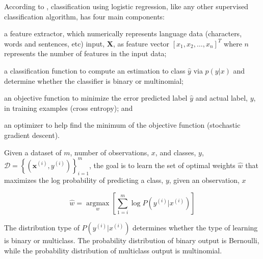  According to \cite{jurafsky2014speech}, classification using logistic regression, like any other supervised classification algorithm, has four main components: 

\begin{list}{•}{}
 \item a feature extractor, which  numerically represents language data (characters, words and sentences, etc) input, $\mathbf{X}$, as feature vector $\left[x_1,x_2,\ldots,x_n \right]^T$ where $n$  represents the number of features in the input data;

\item a classification function to compute an estimation to class $\hat{y}$ via $p(y|x)$ and determine whether the classifier is binary or multinomial; 
 
\item an objective function to minimize the error predicted label $\hat{y}$ and actual label, $y$, in training examples (cross entropy); and

\item an optimizer to help find the minimum of the objective function 
 (stochastic gradient descent).
 \end{list}


Given a dataset of $m$, number of observations, $x$, and classes, $y$, $\mathcal { D } = \left\{ \left( \boldsymbol { x } ^ { ( i ) } , y ^ { ( i ) } \right) \right\} _ { i = 1 } ^ { m }$, the goal is to learn the set of optimal weights $\hat{w}$ that maximizes the log probability of predicting a class, $y$, given an observation, $x$

\begin{equation}
\hat{w}=\underset{w}{\operatorname{argmax}}\left[\sum_{1=i}^{m} \log P\left(y^{(i)} | x^{(i)}\right)\right]
\end{equation}

The distribution type of $P\left(y^{(i)} | x^{(i)}\right)$ determines whether the type of learning is binary or multiclass. The probability distribution of binary output is Bernoulli, while the probability distribution of multiclass output is multinomial. 

